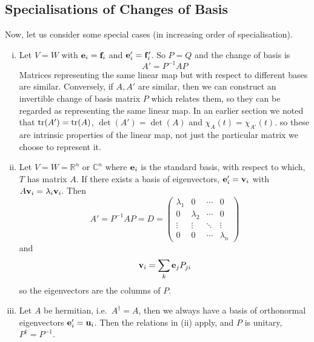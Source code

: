 \subsection{Specialisations of Changes of Basis}
Now, let us consider some special cases (in increasing order of specialisation).
\begin{enumerate}[(i)]
	\item Let \(V=W\) with \(\vb e_i = \vb f_i\) and \(\vb e'_i = \vb f'_i\).
	      So \(P=Q\) and the change of basis is
	      \[
		      A' = P^{-1}AP
	      \]
	      Matrices representing the same linear map but with respect to different bases are similar.
	      Conversely, if \(A, A'\) are similar, then we can construct an invertible change of basis matrix \(P\) which relates them, so they can be regarded as representing the same linear map.
	      In an earlier section we noted that \(\tr(A') = \tr(A)\), \(\det(A') = \det(A)\) and \(\chi_A(t) = \chi_{A'}(t)\).
	      so these are intrinsic properties of the linear map, not just the particular matrix we choose to represent it.
	\item Let \(V=W=\mathbb R^n\) or \(\mathbb C^n\) where \(\vb e_i\) is the standard basis, with respect to which, \(T\) has matrix \(A\).
	      If there exists a basis of eigenvectors, \(\vb e'_i = \vb v_i\) with \(A\vb v_i = \lambda_i\vb v_i\).
	      Then
	      \[
		      A' = P^{-1}AP = D = \begin{pmatrix}
			      \lambda_1 & 0         & \cdots & 0         \\
			      0         & \lambda_2 & \cdots & 0         \\
			      \vdots    & \vdots    & \ddots & \vdots    \\
			      0         & 0         & \cdots & \lambda_n
		      \end{pmatrix}
	      \]
	      and
	      \[
		      \vb v_i = \sum_k \vb e_j P_{ji}
	      \]
	      so the eigenvectors are the columns of \(P\).
	\item Let \(A\) be hermitian, i.e.\ \(A^\dagger = A\), then we always have a basis of orthonormal eigenvectors \(\vb e'_i = \vb u_i\).
	      Then the relations in (ii) apply, and \(P\) is unitary, \(P^\dagger = P^{-1}\).
\end{enumerate}

